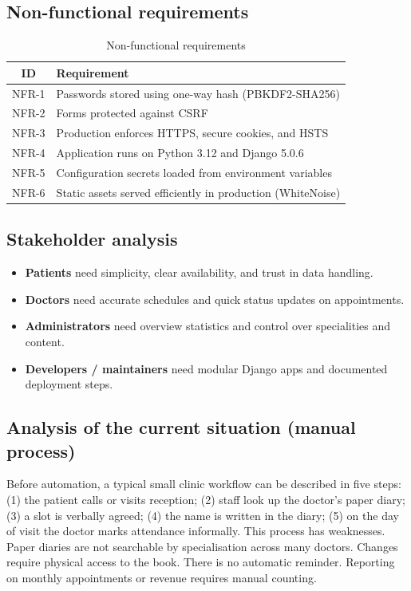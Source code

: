 \subsection{Non-functional requirements}

\begin{table}[htbp]
  \centering
  \caption{Non-functional requirements}
  \begin{tabular}{@{}cl@{}}
    \toprule
    ID & Requirement \\
    \midrule
    NFR-1 & Passwords stored using one-way hash (PBKDF2-SHA256) \\
    NFR-2 & Forms protected against CSRF \\
    NFR-3 & Production enforces HTTPS, secure cookies, and HSTS \\
    NFR-4 & Application runs on Python 3.12 and Django 5.0.6 \\
    NFR-5 & Configuration secrets loaded from environment variables \\
    NFR-6 & Static assets served efficiently in production (WhiteNoise) \\
    \bottomrule
  \end{tabular}
\end{table}

\subsection{Stakeholder analysis}

\begin{itemize}
  \item \textbf{Patients} need simplicity, clear availability, and trust in data handling.
  \item \textbf{Doctors} need accurate schedules and quick status updates on appointments.
  \item \textbf{Administrators} need overview statistics and control over specialities and content.
  \item \textbf{Developers / maintainers} need modular Django apps and documented deployment steps.
\end{itemize}

\subsection{Analysis of the current situation (manual process)}

Before automation, a typical small clinic workflow can be described in five steps: (1) the patient calls or visits reception; (2) staff look up the doctor's paper diary; (3) a slot is verbally agreed; (4) the name is written in the diary; (5) on the day of visit the doctor marks attendance informally. This process has weaknesses. Paper diaries are not searchable by specialisation across many doctors. Changes require physical access to the book. There is no automatic reminder. Reporting on monthly appointments or revenue requires manual counting.

